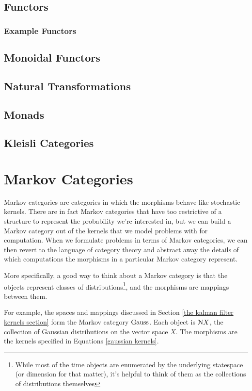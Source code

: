 
\subsection{Functors}
\subsubsection{Example Functors}
\subsection{Monoidal Functors}
\subsection{Natural Transformations}
\subsection{Monads}
\subsection{Kleisli Categories}

\section{Markov Categories}

Markov categories are categories in which the morphisms behave like stochastic kernels.
There are in fact Markov categories that have too restrictive of a structure to represent the probability we're interested in, but we can build a Markov category out of the kernels that we model problems with for computation.
When we formulate problems in terms of Markov categories, we can then revert to the language of category theory and abstract away the details of which computations the morphisms in a particular Markov category represent.

More specifically, a good way to think about a Markov category is that the objects represent classes of distributions\footnote{While most of the time objects are enumerated by the underlying statespace (or dimension for that matter), it's helpful to think of them as the collections of distributions themselves}, and the morphisms are mappings between them.

For example, the spaces and mappings discussed in Section \ref{the kalman filter kernels section} form the Markov category $\mathrm{Gauss}$.
Each object is $\mathcal{N} X$, the collection of Gaussian distributions on the vector space $X$.
The morphisms are the kernels specified in Equations \ref{gaussian kernels}.

